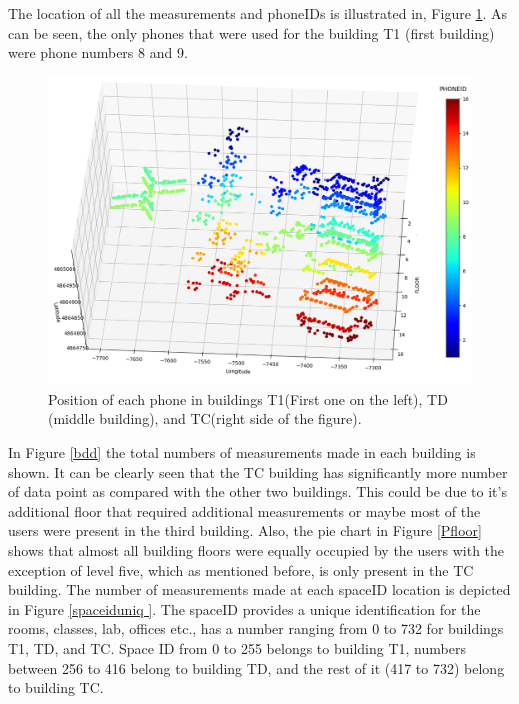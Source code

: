 The location of all the measurements and phoneIDs is illustrated in, Figure \ref{phoneall}. As can be seen, the only phones that were used for the building T1 (first building) were phone numbers 8 and 9. 


\begin{figure}
    \centering
    \includegraphics[width = 10 cm]{image/Chapters/Chapter6/LatLongUser.png}
    \caption{Position of each phone in buildings T1(First one on the left), TD (middle building), and TC(right side of the figure).}
    \label{phoneall}
\end{figure}


In Figure \ref{bdd} the total numbers of measurements made in each building is shown. It can be clearly seen that the TC building has significantly more number of data point as compared with the other two buildings. This could be due to it's additional floor that required additional measurements or maybe most of the users were present in the third building. Also, the pie chart in Figure \ref{Pfloor} shows that almost all building floors were equally occupied by the users with the exception of level five, which as mentioned before, is only present in the TC building. The number of measurements made at each spaceID location is depicted in Figure \ref{spaceiduniq }. The spaceID provides a unique identification for the rooms, classes, lab, offices etc., has a number ranging from 0 to 732 for  buildings T1, TD, and TC. Space ID from 0 to 255 belongs to building T1, numbers between 256 to 416 belong to building TD, and the rest of it (417 to 732) belong to building TC.



